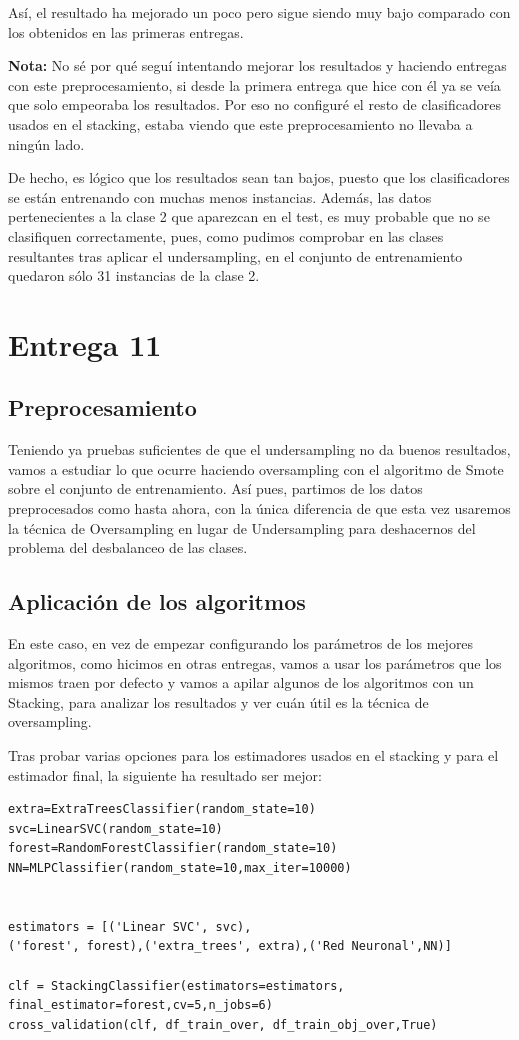 \documentclass[a4paper,11pt]{article}
\begin{document}
Así, el resultado ha mejorado un poco pero sigue siendo muy bajo comparado con los obtenidos en las primeras entregas.

\textbf{Nota:} No sé por qué seguí intentando mejorar los resultados y haciendo entregas con este preprocesamiento, si desde la primera entrega que hice con él ya se veía que solo empeoraba los resultados. Por eso no configuré el resto de clasificadores usados en el stacking, estaba viendo que este preprocesamiento no llevaba a ningún lado. 

De hecho, es lógico que los resultados sean tan bajos, puesto que los clasificadores se están entrenando con muchas menos instancias. Además, las datos pertenecientes a la clase 2 que aparezcan en el test, es muy probable que no se clasifiquen correctamente, pues, como pudimos comprobar en las clases resultantes tras aplicar el undersampling, en el conjunto de entrenamiento quedaron sólo 31 instancias de la clase 2.
\section{Entrega 11}
\subsection{Preprocesamiento}
Teniendo ya pruebas suficientes de que el undersampling no da buenos resultados, vamos a estudiar lo que ocurre haciendo oversampling con el algoritmo de Smote sobre el conjunto de entrenamiento. 
Así pues, partimos de los datos preprocesados como hasta ahora, con la única diferencia de que esta vez usaremos la técnica de Oversampling en lugar de Undersampling para deshacernos del problema del desbalanceo de las clases. 

\subsection{Aplicación de los algoritmos}
En este caso, en vez de empezar configurando los parámetros de los mejores algoritmos, como hicimos en otras entregas, vamos a usar los parámetros que los mismos traen por defecto y vamos a apilar algunos de los algoritmos con un Stacking, para analizar los resultados y ver cuán útil es la técnica de oversampling.

Tras probar varias opciones para los estimadores usados en el stacking y para el estimador final, la siguiente ha resultado ser mejor:
\begin{verbatim}
extra=ExtraTreesClassifier(random_state=10)
svc=LinearSVC(random_state=10)
forest=RandomForestClassifier(random_state=10)
NN=MLPClassifier(random_state=10,max_iter=10000)


estimators = [('Linear SVC', svc),
('forest', forest),('extra_trees', extra),('Red Neuronal',NN)]

clf = StackingClassifier(estimators=estimators, final_estimator=forest,cv=5,n_jobs=6)
cross_validation(clf, df_train_over, df_train_obj_over,True)
\end{verbatim}
\end{document}
